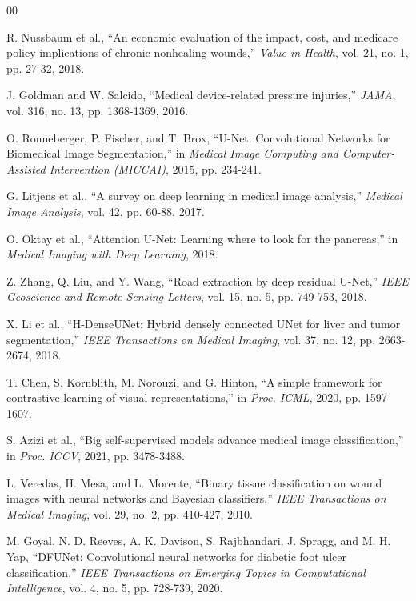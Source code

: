 \documentclass[conference]{IEEEtran}
\begin{document}
\begin{thebibliography}{00}

R. Nussbaum et al., ``An economic evaluation of the impact, cost, and medicare policy implications of chronic nonhealing wounds,'' \textit{Value in Health}, vol. 21, no. 1, pp. 27-32, 2018.

J. Goldman and W. Salcido, ``Medical device-related pressure injuries,'' \textit{JAMA}, vol. 316, no. 13, pp. 1368-1369, 2016.

O. Ronneberger, P. Fischer, and T. Brox, ``U-Net: Convolutional Networks for Biomedical Image Segmentation,'' in \textit{Medical Image Computing and Computer-Assisted Intervention (MICCAI)}, 2015, pp. 234-241.

G. Litjens et al., ``A survey on deep learning in medical image analysis,'' \textit{Medical Image Analysis}, vol. 42, pp. 60-88, 2017.

O. Oktay et al., ``Attention U-Net: Learning where to look for the pancreas,'' in \textit{Medical Imaging with Deep Learning}, 2018.

Z. Zhang, Q. Liu, and Y. Wang, ``Road extraction by deep residual U-Net,'' \textit{IEEE Geoscience and Remote Sensing Letters}, vol. 15, no. 5, pp. 749-753, 2018.

X. Li et al., ``H-DenseUNet: Hybrid densely connected UNet for liver and tumor segmentation,'' \textit{IEEE Transactions on Medical Imaging}, vol. 37, no. 12, pp. 2663-2674, 2018.

T. Chen, S. Kornblith, M. Norouzi, and G. Hinton, ``A simple framework for contrastive learning of visual representations,'' in \textit{Proc. ICML}, 2020, pp. 1597-1607.

S. Azizi et al., ``Big self-supervised models advance medical image classification,'' in \textit{Proc. ICCV}, 2021, pp. 3478-3488.

L. Veredas, H. Mesa, and L. Morente, ``Binary tissue classification on wound images with neural networks and Bayesian classifiers,'' \textit{IEEE Transactions on Medical Imaging}, vol. 29, no. 2, pp. 410-427, 2010.

M. Goyal, N. D. Reeves, A. K. Davison, S. Rajbhandari, J. Spragg, and M. H. Yap, ``DFUNet: Convolutional neural networks for diabetic foot ulcer classification,'' \textit{IEEE Transactions on Emerging Topics in Computational Intelligence}, vol. 4, no. 5, pp. 728-739, 2020.


\end{thebibliography}
\end{document}
